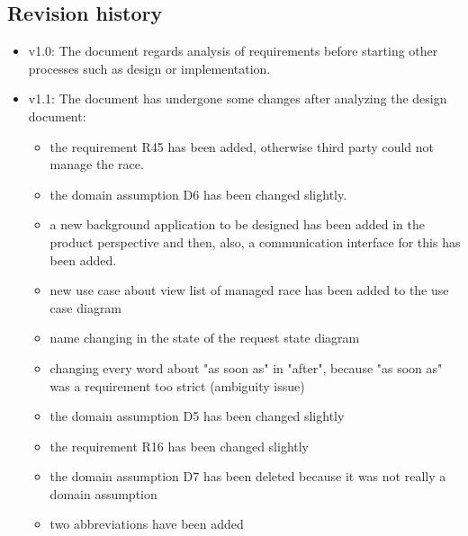 \subsection{Revision history}
\begin{itemize}
\item v1.0: The document regards analysis of requirements before starting other processes such as design or implementation.
\item v1.1: The document has undergone some changes after analyzing the design document:
	\begin{itemize}
	\item the requirement R45 has been added, otherwise third party could not manage the race.
	\item the domain assumption D6 has been changed slightly.
	\item a new background application to be designed has been added in the product perspective and then, also, a communication interface for this has been added.
	\item new use case about view list of managed race has been added to the use case diagram 
	\item name changing in the state of the request state diagram
	\item changing every word about "as soon as" in "after", because "as soon as" was a requirement too strict (ambiguity issue)
	\item the domain assumption D5 has been changed slightly
	\item the requirement R16 has been changed slightly
	\item the domain assumption D7 has been deleted because it was not really a domain assumption
	\item two abbreviations have been added
	\end{itemize}
\end{itemize}